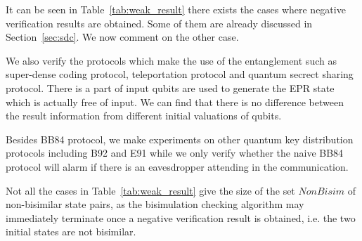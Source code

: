 \documentclass[runningheads]{llncs}
\begin{document}
It can be seen in Table~\ref{tab:weak_result} there exists the cases where negative verification results are obtained. Some of them are already discussed in Section~\ref{sec:sdc}. We now comment on the other case.

We also verify the protocols which make the use of the entanglement such as super-dense coding protocol, teleportation protocol and quantum secrect sharing protocol. There is a part of input qubits are used to generate the EPR state which is actually free of input. We can find that there is no difference between the result information from different initial valuations of qubits.

Besides BB84 protocol, we make experiments on other quantum key distribution protocols including B92 and E91 while we only verify whether the naive BB84 protocol will alarm if there is an eavesdropper attending in the communication.

Not all the cases in Table~\ref{tab:weak_result} give the size of the set $NonBisim$ of non-bisimilar state pairs, as the bisimulation checking algorithm may immediately terminate once a negative verification result is obtained, i.e. the two initial states are not bisimilar. 
\end{document}

